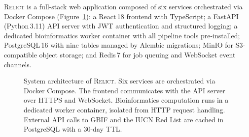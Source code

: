 \documentclass[11pt, a4paper]{article}
\newcommand{\relict}{\textsc{Relict}}
\begin{document}
\relict{} is a full-stack web application composed of six services
orchestrated via Docker Compose (Figure~\ref{fig:architecture}):
a React\,18 frontend with TypeScript; a FastAPI (Python\,3.11) API
server with JWT authentication and structured logging; a dedicated
bioinformatics worker container with all pipeline tools
pre-installed; PostgreSQL\,16 with nine tables managed by Alembic
migrations; MinIO for S3-compatible object storage; and Redis\,7 for
job queuing and WebSocket event channels.

\begin{figure}[H]
    \centering
    \caption{System architecture of \relict. Six services are
    orchestrated via Docker Compose. The frontend communicates with
    the API server over HTTPS and WebSocket. Bioinformatics computation
    runs in a dedicated worker container, isolated from HTTP request
    handling. External API calls to GBIF and the IUCN Red List are
    cached in PostgreSQL with a 30-day TTL.}
    \label{fig:architecture}
\end{figure}
\end{document}
